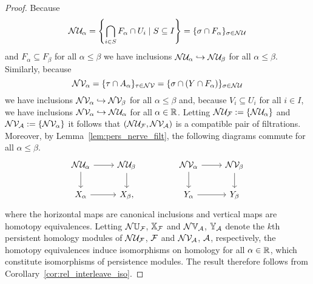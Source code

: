 \begin{proof}
  Because
  \[\mathcal{N}\mathcal{U}_\alpha = \left\{\bigcap_{i\in S} F_\alpha\cap U_i\mid S\subseteq I\right\} = \{\sigma\cap F_\alpha\}_{\sigma\in \mathcal{N}\mathcal{U}}\]
  and $F_\alpha\subseteq F_\beta$ for all $\alpha\leq\beta$ we have inclusions $\mathcal{N}\mathcal{U}_\alpha\hookrightarrow\mathcal{N}\mathcal{U}_\beta$ for all $\alpha\leq\beta$.
  Similarly, because
  \[\mathcal{N}\mathcal{V}_\alpha = \{\tau\cap A_\alpha\}_{\tau\in \mathcal{N}\mathcal{V}} = \{\sigma\cap (Y\cap F_\alpha)\}_{\sigma\in\mathcal{N}\mathcal{U}}\]
  we have inclusions $\mathcal{N}\mathcal{V}_\alpha\hookrightarrow\mathcal{N}\mathcal{V}_\beta$ for all $\alpha\leq\beta$ and, because $V_i\subseteq U_i$ for all $i\in I$, we have inclusions $\mathcal{N}\mathcal{V}_\alpha\hookrightarrow \mathcal{N}\mathcal{U}_\alpha$ for all $\alpha\in\mathbb{R}$.
  Letting $\mathcal{N}\mathcal{U}_{\mathcal{F}} := \{\mathcal{N}\mathcal{U}_\alpha\}$ and $\mathcal{N}\mathcal{V}_{\mathcal{A}} := \{\mathcal{N}\mathcal{V}_\alpha\}$ it follows that $(\mathcal{N}\mathcal{U}_{\mathcal{F}}, \mathcal{N}\mathcal{V}_{\mathcal{A}})$ is a compatible pair of filtrations.
  Moreover, by Lemma~\ref{lem:pers_nerve_filt}, the following diagrams commute for all $\alpha\leq\beta$.
  \[\begin{tikzcd}
      \N\cU_\alpha \arrow{r}\arrow{d} &
      \N\cU_\beta \arrow{d}\\
      X_\alpha\arrow{r} &
      X_\beta,
    \end{tikzcd}\hspace{10ex}
    \begin{tikzcd}
      \N\cV_\alpha \arrow{r}\arrow{d} &
      \N\cV_\beta \arrow{d}\\
      Y_\alpha\arrow{r} &
      Y_\beta
    \end{tikzcd}\]
  where the horizontal maps are canonical inclusions and vertical maps are homotopy equivalences.
  Letting $\mathcal{N}\mathbb{U}_{\mathcal{F}}$, $\mathbb{X}_{\mathcal{F}}$ and $\mathcal{N}\mathbb{V}_{\mathcal{A}}$, $\mathbb{Y}_{\mathcal{A}}$ denote the $k$th persistent homology modules of $\mathcal{N}\mathcal{U}_{\mathcal{F}}$, $\mathcal{F}$ and $\mathcal{N}\mathcal{V}_{\mathcal{A}}$, $\mathcal{A}$, respectively, the homotopy equivalences induce isomorphisms on homology for all $\alpha\in\mathbb{R}$, which constitute isomorphisms of persistence modules.
  The result therefore follows from Corollary~\ref{cor:rel_interleave_iso}.
\end{proof}

